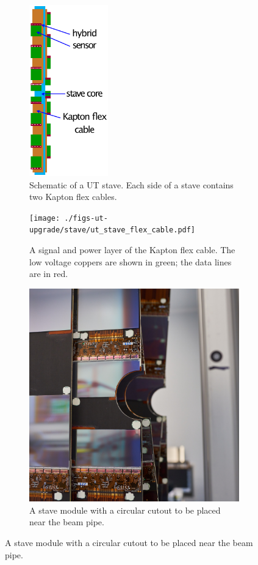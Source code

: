 \begin{figure}[!htb]
    \centering
    \begin{subfigure}[t]{0.48\textwidth}
        \centering
        \includegraphics[height=20em]{./figs-ut-upgrade/stave/ut_stave.pdf}
        \caption{
            Schematic of a UT stave.
            Each side of a stave contains two Kapton flex cables.
        }
    \end{subfigure}
    \hspace{10pt}
    \begin{subfigure}[t]{0.48\textwidth}
        \centering
        \texttt{[image: ./figs-ut-upgrade/stave/ut\_stave\_flex\_cable.pdf]}
        \caption{
            A signal and power layer of the Kapton flex cable.
            The low voltage coppers are shown in green;
            the data lines are in red.
        }
    \end{subfigure}

    \begin{subfigure}[t]{0.48\textwidth}
        \centering
        \includegraphics[width=\textwidth]{./figs-ut-upgrade/stave/ut_stave_near_beam_pipe.jpg}
        \caption{
            A stave module with a circular cutout to be placed near the beam
            pipe.
        }
    \end{subfigure}


\end{figure}
